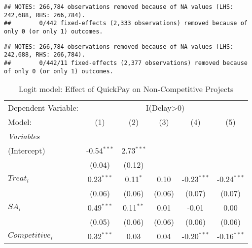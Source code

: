 \documentclass[
]{article}
\begin{document}
\begin{verbatim}
## NOTES: 266,784 observations removed because of NA values (LHS: 242,688, RHS: 266,784).
##        0/442 fixed-effects (2,333 observations) removed because of only 0 (or only 1) outcomes.
\end{verbatim}

\begin{verbatim}
## NOTES: 266,784 observations removed because of NA values (LHS: 242,688, RHS: 266,784).
##        0/442/11 fixed-effects (2,377 observations) removed because of only 0 (or only 1) outcomes.
\end{verbatim}

\begin{table}[htbp]
   \centering
   \caption{Logit model: Effect of QuickPay on Non-Competitive Projects}
   \begin{tabular}{lccccc}
      \tabularnewline\midrule\midrule
      Dependent Variable: & \multicolumn{5}{c}{I(Delay>0)}\\
      Model:                                                                  & (1)           & (2)           & (3)           & (4)           & (5)\\
      \midrule \emph{Variables} &   &   &   &   &  \\
      (Intercept)                                                             & -0.54$^{***}$ & 2.73$^{***}$  &               &               &   \\
                                                                              & (0.04)        & (0.12)        &               &               &   \\
      $Treat_i$                                                               & 0.23$^{***}$  & 0.11$^{*}$    & 0.10          & -0.23$^{***}$ & -0.24$^{***}$\\
                                                                              & (0.06)        & (0.06)        & (0.06)        & (0.07)        & (0.07)\\
      $SA_i$                                                                  & 0.49$^{***}$  & 0.11$^{**}$   & 0.01          & -0.01         & 0.00\\
                                                                              & (0.05)        & (0.06)        & (0.06)        & (0.06)        & (0.06)\\
      $Competitive_i$                                                         & 0.32$^{***}$  & 0.03          & 0.04          & -0.20$^{***}$ & -0.16$^{***}$\\

\end{tabular}
\end{table}
\end{document}
